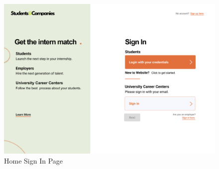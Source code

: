 \documentclass[a4paper,12pt]{article}
\begin{document}
\begin{figure}[H]
    \centering
    \includegraphics[scale = 0.42]{figures/UserInterfaces/General/HomeSignIn.png}
    \caption{Home Sign In Page}
     \centering
\end{figure}
\end{document}
